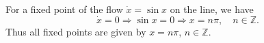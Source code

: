 
For a fixed point of the flow $\dot{x} = \sin{x}$ on the line, we have
\[
  \dot{x} = 0 \Rightarrow \sin{x} = 0 \Rightarrow x = n\pi, \quad n
  \in \mathbb{Z}.
\]
Thus all fixed points are given by $x = n\pi$, $n \in \mathbb{Z}$.
